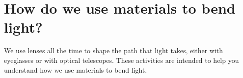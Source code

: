 %	
%	
%	
%	
%
%

\section{How do we use materials to bend light?}

We use lenses all the time to shape the path that light takes, either with eyeglasses or with optical telescopes. These activities are intended to help you understand how we use materials to bend light.

